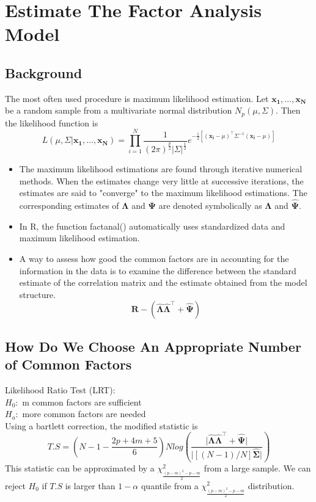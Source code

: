 \documentclass{article}
\begin{document}
\section{Estimate The Factor Analysis Model}

\subsection{Background}
The most often used procedure is maximum likelihood estimation. Let $\mathbf{x_1},\hdots, \mathbf{x_N}$ be a random sample from a multivariate normal distribution $N_p(\mu,\Sigma)$. Then the likelihood function is 
\[L(\mu,\Sigma|\mathbf{x_1},\hdots,\mathbf{x_N})=\prod_{i = 1}^{N}\frac{1}{(2\pi)^\frac{p}{2}\lvert\Sigma\rvert^\frac{1}{2}}e^{-\frac{1}{2}[(\mathbf{x_i}-\mu)^\intercal \Sigma^{-1}(\mathbf{x_i}-\mu)]}\]
\begin{itemize}
    \item The maximum likelihood estimations are found through iterative numerical methods. When the estimates change very little at successive iterations, the estimates are said to "converge" to the maximum likelihood estimations. The corresponding estimates of $\mathbf{\Lambda}$ and $\mathbf{\Psi}$ are denoted symbolically as $\mathbf{\hat{\Lambda}}$ and $\mathbf{\hat{\Psi}}$. 
    \item In R, the function factanal() automatically uses standardized data and maximum likelihood estimation.
    \item A way to assess how good the common factors are in accounting for the information in the data is to examine the difference between the standard estimate of the correlation matrix and the estimate obtained from the model structure. \[\mathbf{R}-(\mathbf{\hat{\Lambda}}\mathbf{\hat{\Lambda}}^\intercal+\mathbf{\hat{\Psi}})\]
\end{itemize}

\subsection{How Do We Choose An Appropriate Number of Common Factors}

Likelihood Ratio Test (LRT):\\
$H_0:$ m common factors are sufficient\\
$H_a:$ more common factors are needed\\
Using a bartlett correction, the modified statistic is 
\[T.S = (N-1-\frac{2p+4m+5}{6})Nlog(\frac{\lvert\mathbf{\hat{\Lambda}}\mathbf{\hat{\Lambda}}^\intercal+\mathbf{\hat{\Psi}\rvert}}{\lvert[(N-1)/N]\mathbf{\hat{\Sigma}}\rvert})\]
This statistic can be approximated by a $\chi^2_\frac{(p-m)^2-p-m}{2}$ from a large sample. We can reject $H_0$ if $T.S$ is larger than $1-\alpha$ quantile from a $\chi^2_\frac{(p-m)^2-p-m}{2}$ distribution.
\end{document}
